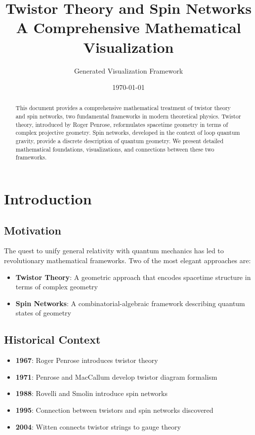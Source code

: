 \documentclass[12pt,a4paper]{article}
\title{\textbf{\Huge Twistor Theory and Spin Networks}\\
\vspace{0.5cm}
\Large A Comprehensive Mathematical Visualization}
\author{Generated Visualization Framework}
\date{\today}
\theoremstyle{definition}
\begin{document}
\maketitle
\tableofcontents
\newpage

\begin{abstract}
This document provides a comprehensive mathematical treatment of twistor theory and spin networks, two fundamental frameworks in modern theoretical physics. Twistor theory, introduced by Roger Penrose, reformulates spacetime geometry in terms of complex projective geometry. Spin networks, developed in the context of loop quantum gravity, provide a discrete description of quantum geometry. We present detailed mathematical foundations, visualizations, and connections between these two frameworks.
\end{abstract}

\section{Introduction}

\subsection{Motivation}
The quest to unify general relativity with quantum mechanics has led to revolutionary mathematical frameworks. Two of the most elegant approaches are:

\begin{itemize}[leftmargin=*]
    \item \textbf{Twistor Theory}: A geometric approach that encodes spacetime structure in terms of complex geometry
    \item \textbf{Spin Networks}: A combinatorial-algebraic framework describing quantum states of geometry
\end{itemize}

\subsection{Historical Context}
\begin{tcolorbox}[colback=lightblue!10,colframe=deepblue,title=Historical Timeline]
\begin{itemize}
    \item \textbf{1967}: Roger Penrose introduces twistor theory
    \item \textbf{1971}: Penrose and MacCallum develop twistor diagram formalism
    \item \textbf{1988}: Rovelli and Smolin introduce spin networks
    \item \textbf{1995}: Connection between twistors and spin networks discovered
    \item \textbf{2004}: Witten connects twistor strings to gauge theory
\end{itemize}
\end{tcolorbox}
\end{document}
